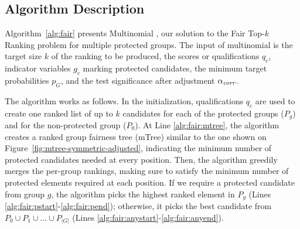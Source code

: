 \begin{algorithm}[h]
{{			\label{alg:fair:pend}
		}
		\label{alg:fair:anyend}

	}
	\Return{$\tau^*$}
\end{algorithm}

\subsection{Algorithm Description}\label{subsec:algorithm-description}

Algorithm~\ref{alg:fair} presents Multinomial \algoFAIR, our solution to the {\sc Fair Top-$k$ Ranking} problem for multiple protected groups.
%
The input of multinomial \algoFAIR is
the target size $k$ of the ranking to be produced,
the scores or qualifications $q_c$,
indicator variables $g_c$ marking protected candidates,
the minimum target probabilities $p_G$, and
the test significance after adjustment $\alpha_\textit{corr}$.
%

The algorithm works as follows.
%
In the initialization, qualifications $q_c$ are used to create one ranked list of up to $k$ candidates for each of the protected groups ($P_g$) and for the non-protected group ($P_0$).
%
At Line \ref{alg:fair:mtree}, the algorithm creates a ranked group fairness tree (mTree) similar to the one shown on Figure~\ref{fig:mtree-symmetric-adjusted}, indicating the minimum number of protected candidates needed at every position. %
%
Then, the algorithm greedily merges the per-group rankings, making sure to satisfy the minimum number of protected elements required at each position.
%
If we require a protected candidate from group $g$, the algorithm picks the highest ranked element in $P_g$ (Lines \ref{alg:fair:pstart}-\ref{alg:fair:pend}); otherwise, it picks the best candidate from $P_0 \cup P_1 \cup \ldots \cup P_{|G|}$ (Lines \ref{alg:fair:anystart}-\ref{alg:fair:anyend}).
%

